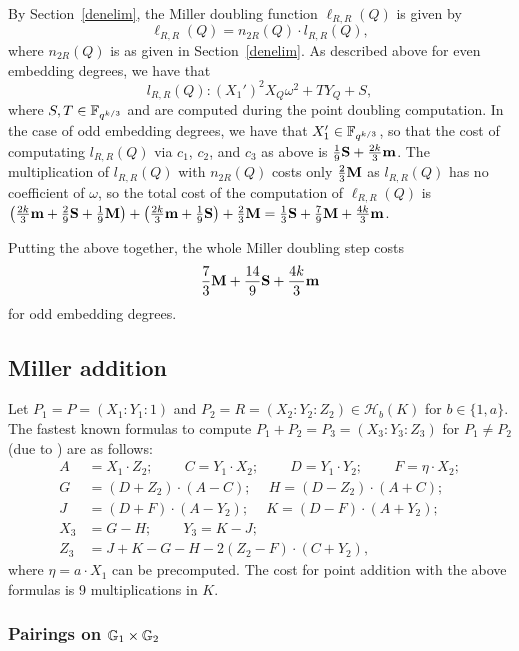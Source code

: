 By Section~\ref{denelim}, the Miller doubling function $\ell_{R,R}(Q)$ is given by
\[\ell_{R,R}(Q) = n_{2R}(Q) \cdot l_{R,R}(Q),\]
where $n_{2R}(Q)$ is as given in Section~\ref{denelim}.
As described above for even embedding degrees, we have that
\[l_{R,R}(Q): (X_1')^2X_Q\omega^2 + T Y_Q + S,\]
where $S,T \in \mathbb{F}_{q^{k/3}}$ and are computed during the point doubling computation. 
In the case of odd embedding degrees, we have that $X_1' \in \mathbb{F}_{q^{k/3}}$,
so that the cost of computating $l_{R,R}(Q)$ via $c_1$, $c_2$, and $c_3$ as above is
$\frac{1}{9}\textbf{S} + \frac{2k}{3}\textbf{m}$.
The multiplication of $l_{R,R}(Q)$ with $n_{2R}(Q)$ costs only $\frac{2}{3}\textbf{M}$ as $l_{R,R}(Q)$ has no coefficient of $\omega$, so the total cost of the computation of $\ell_{R,R}(Q)$ is 
$\left(\frac{2k}{3}\textbf{m} + \frac{2}{9}\textbf{S} + \frac{1}{9}\textbf{M}\right)
+ \left(\frac{2k}{3}\textbf{m} + \frac{1}{9}\textbf{S} \right)
+ \frac{2}{3}\textbf{M}
=
\frac{1}{3}\textbf{S} + \frac{7}{9}\textbf{M} + \frac{4k}{3}\textbf{m}$.

Putting the above together, the whole Miller doubling step costs
\[\frac{7}{3}\textbf{M} + \frac{14}{9}\textbf{S} + \frac{4k}{3}\textbf{m}\]
for odd embedding degrees.

\subsection{Miller addition}

Let $P_1 = P = (X_1:Y_1:1)$ and $P_2 = R = (X_2:Y_2:Z_2) \in \mathcal{H}_b(K)$ for $b \in \{1,a\}$.
The fastest known formulas to compute $P_1 + P_2 = P_3 = (X_3:Y_3:Z_3)$
for $P_1 \neq P_2$ (due to \cite{2010/hisil-thesis}) are as follows:
\begin{align*}
A &= X_1 \cdot Z_2;\	\qquad
C = Y_1 \cdot X_2;\	\qquad
D = Y_1 \cdot Y_2;\	\qquad
F = \eta \cdot X_2;\\
G &= (D + Z_2) \cdot (A - C);\	\quad
H = (D - Z_2) \cdot (A + C);\\
J &= (D + F) \cdot (A - Y_2);\	\quad
K = (D - F) \cdot (A + Y_2);\\
X_3 &= G - H;\	\qquad
Y_3 = K - J;\\
Z_3 &= J + K - G - H - 2(Z_2 - F) \cdot (C + Y_2),
\end{align*}
where $\eta = a\cdot X_1$ can be precomputed.
The cost for point addition with the above formulas is 9 multiplications in $K$.

\subsubsection{Pairings on $\mathbb{G}_{1} \times \mathbb{G}_{2}$}

